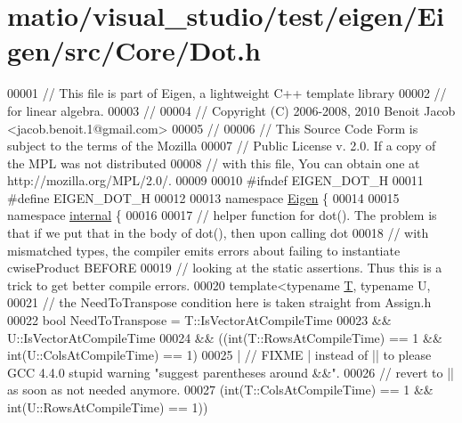 \hypertarget{matio_2visual__studio_2test_2eigen_2_eigen_2src_2_core_2_dot_8h_source}{}\section{matio/visual\+\_\+studio/test/eigen/\+Eigen/src/\+Core/\+Dot.h}
\label{matio_2visual__studio_2test_2eigen_2_eigen_2src_2_core_2_dot_8h_source}

\begin{DoxyCode}
00001 \textcolor{comment}{// This file is part of Eigen, a lightweight C++ template library}
00002 \textcolor{comment}{// for linear algebra.}
00003 \textcolor{comment}{//}
00004 \textcolor{comment}{// Copyright (C) 2006-2008, 2010 Benoit Jacob <jacob.benoit.1@gmail.com>}
00005 \textcolor{comment}{//}
00006 \textcolor{comment}{// This Source Code Form is subject to the terms of the Mozilla}
00007 \textcolor{comment}{// Public License v. 2.0. If a copy of the MPL was not distributed}
00008 \textcolor{comment}{// with this file, You can obtain one at http://mozilla.org/MPL/2.0/.}
00009 
00010 \textcolor{preprocessor}{#ifndef EIGEN\_DOT\_H}
00011 \textcolor{preprocessor}{#define EIGEN\_DOT\_H}
00012 
00013 \textcolor{keyword}{namespace }\hyperlink{namespace_eigen}{Eigen} \{ 
00014 
00015 \textcolor{keyword}{namespace }\hyperlink{namespaceinternal}{internal} \{
00016 
00017 \textcolor{comment}{// helper function for dot(). The problem is that if we put that in the body of dot(), then upon calling
       dot}
00018 \textcolor{comment}{// with mismatched types, the compiler emits errors about failing to instantiate cwiseProduct BEFORE}
00019 \textcolor{comment}{// looking at the static assertions. Thus this is a trick to get better compile errors.}
00020 \textcolor{keyword}{template}<\textcolor{keyword}{typename} \hyperlink{group___sparse_core___module_class_eigen_1_1_triplet}{T}, \textcolor{keyword}{typename} U,
00021 \textcolor{comment}{// the NeedToTranspose condition here is taken straight from Assign.h}
00022          \textcolor{keywordtype}{bool} NeedToTranspose = T::IsVectorAtCompileTime
00023                 && U::IsVectorAtCompileTime
00024                 && ((int(T::RowsAtCompileTime) == 1 && int(U::ColsAtCompileTime) == 1)
00025                       |  \textcolor{comment}{// FIXME | instead of || to please GCC 4.4.0 stupid warning "suggest parentheses
       around &&".}
00026                          \textcolor{comment}{// revert to || as soon as not needed anymore.}
00027                     (\textcolor{keywordtype}{int}(T::ColsAtCompileTime) == 1 && int(U::RowsAtCompileTime) == 1))

\end{DoxyCode}
